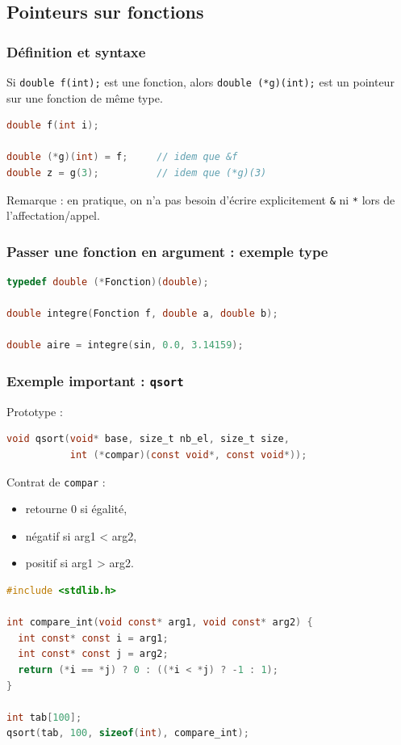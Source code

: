 \subsection{Pointeurs sur fonctions}
\subsubsection{Définition et syntaxe}
Si \texttt{double f(int);} est une fonction, alors \texttt{double (*g)(int);} est un pointeur
sur une fonction de même type.

\begin{lstlisting}[language=C]
double f(int i);

double (*g)(int) = f;     // idem que &f
double z = g(3);          // idem que (*g)(3)
\end{lstlisting}

Remarque : en pratique, on n'a pas besoin d'écrire explicitement \texttt{\&} ni \texttt{*}
lors de l'affectation/appel.

\subsubsection{Passer une fonction en argument : exemple type}
\begin{lstlisting}[language=C]
typedef double (*Fonction)(double);

double integre(Fonction f, double a, double b);

double aire = integre(sin, 0.0, 3.14159);
\end{lstlisting}

\subsubsection{Exemple important : \texttt{qsort}}
Prototype :
\begin{lstlisting}[language=C]
void qsort(void* base, size_t nb_el, size_t size,
           int (*compar)(const void*, const void*));
\end{lstlisting}

Contrat de \texttt{compar} :
\begin{itemize}
  \item retourne 0 si égalité,
  \item négatif si arg1 < arg2,
  \item positif si arg1 > arg2.
\end{itemize}

\begin{lstlisting}[language=C]
#include <stdlib.h>

int compare_int(void const* arg1, void const* arg2) {
  int const* const i = arg1;
  int const* const j = arg2;
  return (*i == *j) ? 0 : ((*i < *j) ? -1 : 1);
}

int tab[100];
qsort(tab, 100, sizeof(int), compare_int);
\end{lstlisting}


